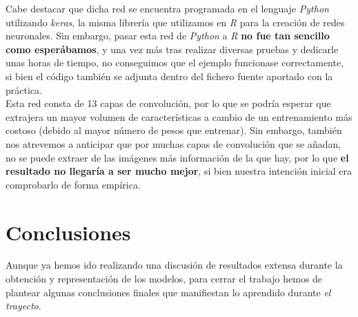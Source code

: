 \documentclass[]{article}
\begin{document}
		Cabe destacar que dicha red se encuentra programada en el lenguaje \textit{Python} utilizando \textit{keras}, la misma librería que utilizamos en \textit{R} para la creación de redes neuronales. Sin embargo, pasar esta red de \textit{Python} a \textit{R} \textbf{no fue tan sencillo como esperábamos}, y una vez más tras realizar diversas pruebas y dedicarle unas horas de tiempo, no conseguimos que el ejemplo funcionase correctamente, si bien el código también se adjunta dentro del fichero fuente aportado con la práctica.\\
		
		Esta red consta de 13 capas de convolución, por lo que se podría esperar que extrajera un mayor volumen de características a cambio de un entrenamiento más costoso (debido al mayor número de pesos que entrenar). Sin embargo, también nos atrevemos a anticipar que por muchas capas de convolución que se añadan, no se puede extraer de las imágenes más información de la que hay, por lo que \textbf{el resultado no llegaría a ser mucho mejor}, si bien nuestra intención inicial era comprobarlo de forma empírica.
	
\section{Conclusiones}

	Aunque ya hemos ido realizando una discusión de resultados extensa durante la obtención y representación de los modelos, para cerrar el trabajo hemos de plantear algunas conclusiones finales que manifiestan lo aprendido durante \textit{el trayecto}.
	
\end{document}
